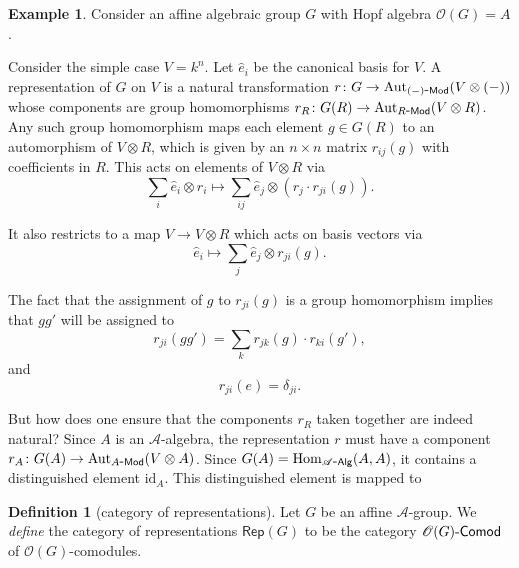 \documentclass[a4paper,10pt]{scrreprt}
\newcommand{\Hom}{\mathrm{Hom}}
\newcommand{\Aut}{\mathrm{Aut}}
\def\mhyp{{\hbox{-}}}
\theoremstyle{definition}
\newtheorem{definition}{Definition}[section]
\newtheorem{example}{Example}[section]
\theoremstyle{plain}
\theoremstyle{remark}
\begin{document}
\begin{example}
  Consider an affine algebraic group $G$ with Hopf algebra $\mathscr{O}(G) = A$.

  Consider the simple case $V = k^{n}$. Let $\hat{e}_{i}$ be the canonical basis for $V$. A representation of $G$ on $V$ is a natural transformation $r\colon G \to \Aut_{(-)\mhyp\mathsf{Mod}}(V \otimes (-))$ whose components are group homomorphisms $r_{R}\colon G(R) \to \Aut_{R\mhyp\mathsf{Mod}}(V \otimes R)$. Any such group homomorphism maps each element $g \in G(R)$ to an automorphism of $V \otimes R$, which is given by an $n \times n$ matrix $r_{ij}(g)$ with coefficients in $R$. This acts on elements of $V \otimes R$ via 
  \begin{equation*}
    \sum_{i} \hat{e}_{i} \otimes r_{i} \mapsto \sum_{ij} \hat{e}_{j} \otimes (r_{j}\cdot r_{ji}(g)).
  \end{equation*}

  It also restricts to a map $V \to V \otimes R$ which acts on basis vectors via
  \begin{equation*}
    \hat{e}_{i} \mapsto \sum_{j} \hat{e}_{j} \otimes r_{ji}(g).
  \end{equation*}

  The fact that the assignment of $g$ to $r_{ji}(g)$ is a group homomorphism implies that $gg'$ will be assigned to 
  \begin{equation*}
    r_{ji}(gg') = \sum_{k} r_{jk}(g) \cdot r_{ki}(g'),
  \end{equation*}
  and 
  \begin{equation*}
    r_{ji}(e) = \delta_{ji}.
  \end{equation*}

  But how does one ensure that the components $r_{R}$ taken together are indeed natural? Since $A$ is an $\mathscr{A}$-algebra, the representation $r$ must have a component $r_{A}\colon G(A) \to \mathrm{Aut}_{A\mhyp\mathsf{Mod}}(V \otimes A)$. Since $G(A) = \Hom_{\mathscr{A}\mhyp\mathsf{Alg}}(A, A)$, it contains a distinguished element $\mathrm{id}_{A}$. This distinguished element is mapped to
\end{example}

\begin{definition}[category of representations]
  \label{def:categoryofrepresentations}
  Let $G$ be an affine $\mathscr{A}$-group. We \emph{define} the category of representations $\mathsf{Rep}(G)$ to be the category $\mathscr{O}(G)\mhyp\mathsf{Comod}$ of $\mathscr{O}(G)$-comodules.
\end{definition}
\end{document}
